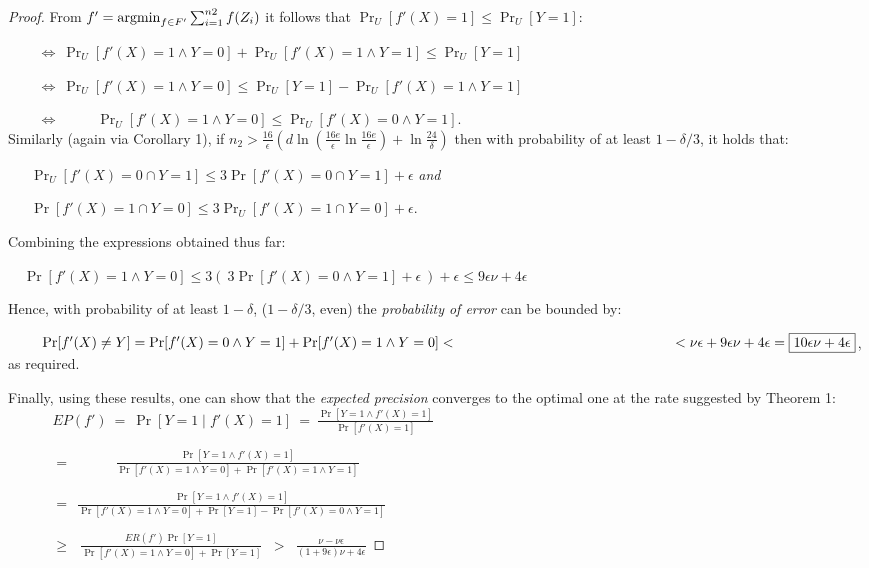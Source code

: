\documentclass[12pt,twoside,notitlepage,amsart]{report} %
\begin{document}
\begin{proof}
	From $ f' = \argmin_{f \in F'}\sum_{i=1}^{n2}{f(Z_i)}$ it follows that $\Pr_U[f'(X) = 1] \leq \Pr_U[Y=1]$: 
	
	$\phantom{aaaa}\Leftrightarrow \ \Pr_U[f'(X) = 1 \wedge Y = 0] + \Pr_U[f'(X) = 1 \wedge Y = 1] \leq \Pr_U[Y=1]$
	
	$\phantom{aaaa}\Leftrightarrow \ \Pr_U[f'(X) = 1 \wedge Y = 0] \leq \Pr_U[Y = 1] - \Pr_U[f'(X) = 1 \wedge Y = 1]$  
	
	$\phantom{aaaa}\Leftrightarrow \phantom{aaaaa} \Pr_U[f'(X) = 1 \wedge Y = 0] \leq \Pr_U[f'(X) = 0 \wedge Y = 1] $. \\
	
	Similarly (again via Corollary 1), if $n_2 > \frac{16}{\epsilon} \left( d \ln( \frac{16e}{\epsilon}\ln\frac{16e}{\epsilon}) + \ln\frac{24}{\delta} \right)$ then with probability of at least $1 - \delta / 3$, it holds that: 
	
	$\phantom{aaa} \Pr_U[f'(X) = 0 \cap Y = 1] \leq 3 \Pr[f'(X)=0 \cap Y=1] + \epsilon$ \emph{and}  
	
	$\phantom{aaa} \Pr[f'(X) = 1 \cap Y = 0] \leq 3 \Pr_U[f'(X)=1 \cap Y=0] + \epsilon$.
	
	Combining the expressions obtained thus far:
	
	$\phantom{aa} \Pr[f'(X) = 1 \wedge Y=0] \leq 3(\ 3\Pr[f'(X)=0 \wedge Y=1]+\epsilon \ ) + \epsilon \leq 9 \epsilon \nu + 4 \epsilon  $
	
	Hence, with probability of at least $1 - \delta$, ($1-\delta/3$, even) the \emph{probability of error} can be bounded by:
	 
	$ \phantom{aaaa} \Pr[f'(X) \neq Y] = \Pr[f'(X) = 0 \wedge Y = 1] + \Pr[f'(X) = 1 \wedge Y = 0] < \\ \phantom{aaaaaaaaaaaaaaaaaaaaaaaaaaaaa} < \nu \epsilon + 9 \epsilon \nu + 4 \epsilon = \boxed{10 \epsilon \nu + 4 \epsilon}$, as required.
	
	Finally, using these results, one can show that the \emph{expected precision} converges to the optimal one at the rate suggested by Theorem 1: \\
	
	
	$\displaystyle \phantom{aaaaaa} EP(f') \ = \ \Pr[Y = 1 \mid f'(X) = 1] \ = \ \frac{\Pr[Y = 1 \wedge f'(X) = 1]}{\Pr[f'(X) = 1]} $
	
	$\displaystyle \phantom{aaaaaa} = \phantom{aaaaaa} \frac{ \Pr[Y = 1 \wedge f'(X) = 1] }{\Pr[f'(X) = 1 \wedge Y = 0] + \Pr[f'(X) = 1 \wedge Y = 1]} $
	
	$\displaystyle \phantom{aaaaaa} = \ \  \frac{\Pr[Y = 1 \wedge f'(X) = 1]}{\Pr[f'(X) = 1 \wedge Y = 0] + \Pr[Y = 1] - \Pr[f'(X) = 0 \wedge Y = 1]} $
	
	$\displaystyle \phantom{aaaaaa} \geq \ \ \ \frac{ER(f') \Pr[Y=1]}{\Pr[f'(X) = 1 \wedge Y = 0] + \Pr[Y = 1]} \phantom{a} > \phantom{a} \boxed{ \frac{\nu - \nu \epsilon}{ (1+9 \epsilon) \nu + 4 \epsilon} } $
	
	\end{proof} \\
	
\end{document}
